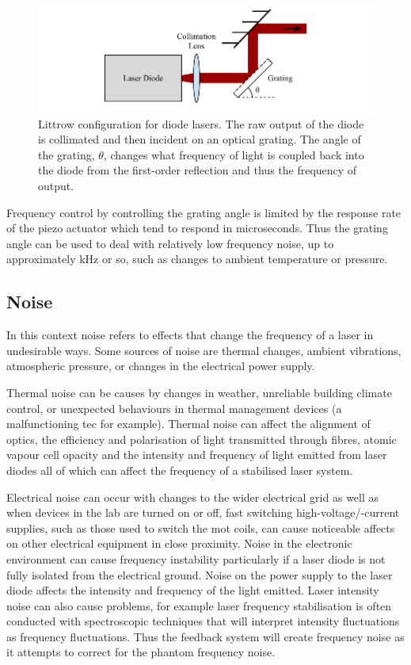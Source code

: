 \begin{figure}
\includegraphics{part1/Figs/LittrowConfiguration.pdf}
\caption[Littrow configuration diode laser.]{Littrow configuration for diode lasers. The raw output of the diode is collimated and then incident on an optical grating. The angle of the grating, $\theta$, changes what frequency of light is coupled back into the diode from the first-order reflection and thus the frequency of output.}
\label{figure:littrow}
\end{figure}

Frequency control by controlling the grating angle is limited by the response rate of the piezo actuator which tend to respond in microseconds.
Thus the grating angle can be used to deal with relatively low frequency noise, up to approximately \unit[100]{kHz} or so, such as changes to ambient temperature or pressure.

\subsection{Noise}
In this context noise refers to effects that change the frequency of a laser in undesirable ways.
Some sources of noise are thermal changes, ambient vibrations, atmospheric pressure, or changes in the electrical power supply.

Thermal noise can be causes by changes in weather, unreliable building climate control, or unexpected behaviours in thermal management devices (a malfunctioning \gls{tec} for example).
Thermal noise can affect the alignment of optics, the efficiency and polarisation of light transmitted through fibres, atomic vapour cell opacity and the intensity and frequency of light emitted from laser diodes all of which can affect the frequency of a stabilised laser system.

Electrical noise can occur with changes to the wider electrical grid as well as when devices in the lab are turned on or off, fast switching high-voltage/-current supplies, such as those used to switch the \gls{mot} coils, can cause noticeable affects on other electrical equipment in close proximity.
Noise in the electronic environment can cause frequency instability particularly if a laser diode is not fully isolated from the electrical ground. Noise on the power supply to the laser diode affects the intensity and frequency of the light emitted.
Laser intensity noise can also cause problems, for example laser frequency stabilisation is often conducted with spectroscopic techniques that will interpret intensity fluctuations as frequency fluctuations. Thus the feedback system will create frequency noise as it attempts to correct for the phantom frequency noise.

